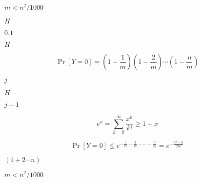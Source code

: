 \documentclass[10pt]{book}
\begin{document}
\begin{mdSnippets}
\begin{mdInlineSnippet}
$m  < n^2/1000$\end{mdInlineSnippet}%
\begin{mdInlineSnippet}[c1d9f50f86825a1a2302ec2449c17196]%
$H$\end{mdInlineSnippet}%
\begin{mdInlineSnippet}[cb5ae17636e975f9bf71ddf5bc542075]%
$0.1$\end{mdInlineSnippet}%
\begin{mdInlineSnippet}[c1d9f50f86825a1a2302ec2449c17196]%
$H$\end{mdInlineSnippet}%
\begin{mdDisplaySnippet}[344ec26b2a133155e77bc70459e715c8]%
\[%
\Pr[Y = 0] = (1-\frac{1}{m})(1 - \frac{2}{m})\cdots(1 - \frac{n}{m}) 
\]%
\end{mdDisplaySnippet}%
\begin{mdInlineSnippet}[363b122c528f54df4a0446b6bab05515]%
$j$\end{mdInlineSnippet}%
\begin{mdInlineSnippet}[c1d9f50f86825a1a2302ec2449c17196]%
$H$\end{mdInlineSnippet}%
\begin{mdInlineSnippet}[2c5f6ad28c3ee10c25743b5e062dad5f]%
$j - 1$\end{mdInlineSnippet}%
\begin{mdDisplaySnippet}[2e59f2b50f508b79f5067a426f3a8343]%
\[%
e^x = \sum_{k=0}^{\infty} \frac{x^k}{k!} \geq 1 + x
\]%
\end{mdDisplaySnippet}%
\begin{mdDisplaySnippet}%
\[%
\Pr[Y = 0] \leq e^{-\frac{1}{m} - \frac{2}{m} - \cdots - \frac{n}{m}} = e^{-\frac{n^2-n}{2m}}
\]%
\end{mdDisplaySnippet}%
\begin{mdInlineSnippet}[a14448918f7133722e6a285659c82fcd]%
$(1 + 2 \cdots n)$\end{mdInlineSnippet}%
\begin{mdInlineSnippet}[02bd71b22cf41263f3852805366499fd]%
$m < n^2 /1000$\end{mdInlineSnippet}%
\begin{mdDisplaySnippet}[e6fa94618272f57c7cf6d1eea8ab6a87]%

\end{mdDisplaySnippet}
\end{mdSnippets}
\end{document}
